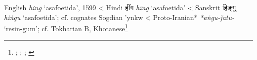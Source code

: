 \begin{etymology}\label{ety:hing}
English \textit{hing} `asafoetida', 1599
< Hindi {हींग} \textit{hīng} `asafoetida'
< Sanskrit {हिङ्गु} \textit{hiṅgu} `asafoetida'; cf. cognates Sogdian 'ynkw
< Proto-Iranian* \textit{*aṅgu-ǰatu-} `resin-gum'; cf. Tokharian B, Khotanese\footnote{\textcite[s.v. hing]{oed}; \textcite[s.v. hing]{oed}; \textcite[87]{gharib_sogdian_1995}; \textcite[7]{adams_dictionary_2013}}
\end{etymology}